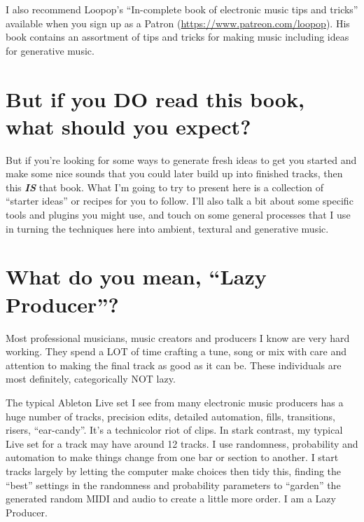 \documentclass[
  12pt,
  letterpaper,
  oneside,
  open=any]{scrbook}
\begin{document}
I also recommend Loopop's ``In-complete book of electronic music tips
and tricks'' available when you sign up as a Patron
(\url{https://www.patreon.com/loopop}). His book contains an assortment
of tips and tricks for making music including ideas for generative
music.

\section*{But if you DO read this book, what should you
expect?}\label{but-if-you-do-read-this-book-what-should-you-expect}


But if you're looking for some ways to generate fresh ideas to get you
started and make some nice sounds that you could later build up into
finished tracks, then this \textbf{\emph{IS}} that book. What I'm going
to try to present here is a collection of ``starter ideas'' or recipes
for you to follow. I'll also talk a bit about some specific tools and
plugins you might use, and touch on some general processes that I use in
turning the techniques here into ambient, textural and generative music.

\section*{What do you mean, ``Lazy
Producer''?}\label{what-do-you-mean-lazy-producer}


Most professional musicians, music creators and producers I know are
very hard working. They spend a LOT of time crafting a tune, song or mix
with care and attention to making the final track as good as it can be.
These individuals are most definitely, categorically NOT lazy.

The typical Ableton Live set I see from many electronic music producers
has a huge number of tracks, precision edits, detailed automation,
fills, transitions, risers, ``ear-candy''. It's a technicolor riot of
clips. In stark contrast, my typical Live set for a track may have
around 12 tracks. I use randomness, probability and automation to make
things change from one bar or section to another. I start tracks largely
by letting the computer make choices then tidy this, finding the
``best'' settings in the randomness and probability parameters to
``garden'' the generated random MIDI and audio to create a little more
order. I am a Lazy Producer.
\end{document}
